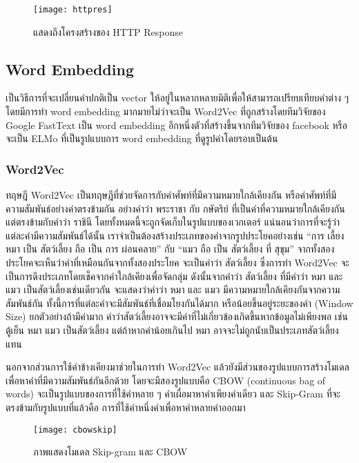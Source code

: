 \begin{figure}[H]
    \centering
    \texttt{[image: httpres]}
    \caption{แสดงถึงโครงสร้างของ HTTP Response \cite{Saixiii}}\label{fig:httpres}
\end{figure}

\subsection{Word Embedding}

เป็นวิธีการที่จะเปลี่ยนคำปกติเป็น vector ให้อยู่ในหลากหลายมิติเพื่อให้สามารถเปรียบเทียบคำต่าง ๆ 
 โดยมีการทำ word embedding มากมายไม่ว่าจะเป็น Word2Vec \cite{xin} \cite{Goldberg} ที่ถูกสร้างโดยทีมวิจัยของ 
Google FastText \cite{fasttext} เป็น word embedding อีกหนึ่งตัวที่สร้างขึ้นจากทีมวิจัยของ facebook หรือจะเป็น ELMo \cite{matthew} 
ที่เป็นรูปแบบการ word embedding ที่ดูรูปคำโดยรอบเป็นต้น 



\subsubsection{Word2Vec}
ทฤษฎี Word2Vec\cite{shortStoryForWord2Vec} เป็นทฤษฎีที่ช่วยจัดการกับคำศัพท์ที่มีความหมายใกล้เคียงกัน หรือคำศัพท์ที่มีความสัมพันธ์อย่างคำตรงข้ามกัน 
อย่างคำว่า พระราชา กับ กษัตริย์ ที่เป็นคำที่ความหมายใกล้เคียงกัน แต่ตรงข้ามกับคำว่า ราชินี โดยทั้งหมดนี้จะถูกจัดเก็บในรูปแบบของเวกเตอร์
แน่นอนว่าการที่จะรู้ว่าแต่ละคำมีความสัมพันธ์ได้นั้น เราจำเป็นต้องสร้างประเภทของคำจากรูปประโยคอย่างเช่น “การ เลี้ยง หมา เป็น สัตว์เลี้ยง ถือ เป็น การ ผ่อนคลาย” 
กับ “แมว ถือ เป็น สัตว์เลี้ยง ที่ สุขุม” จากทั้งสองประโยคจะเห็นว่าคำที่เหมือนกันจากทั้งสองประโยค จะเป็นคำว่า สัตว์เลี้ยง ซึ่งการทำ Word2Vec 
จะเป็นการดึงประเภทโดยเช็คจากคำใกล้เคียงเพื่อจัดกลุ่ม ดังนั้นจากคำว่า สัตว์เลี้ยง ที่มีคำว่า หมา และ แมว เป็นสัตว์เลี้ยงเช่นเดียวกัน จะแสดงว่าคำว่า 
หมา และ แมว มีความหมายใกล้เคียงกันจากความสัมพันธ์กัน ทั้งนี้การที่แต่ละคำจะมีสัมพันธ์ที่เชื่อมโยงกันได้มาก หรือน้อยขึ้นอยู่ระยะของคำ (Window Size) 
ยกตัวอย่างถ้ามีค่ามาก คำว่าสัตว์เลี้ยงอาจจะมีคำที่ไม่เกี่ยวข้องเกิดขึ้นหากข้อมูลไม่เพียงพอ เช่น ตู้เย็น หมา แมว เป็นสัตว์เลี้ยง แต่ถ้าหากค่าน้อยเกินไป หมา 
อาจจะไม่ถูกนับเป็นประเภทสัตว์เลี้ยงแทน

นอกจากส่วนการใช้คำข้างเคียงมาช่วยในการทำ Word2Vec แล้วยังมีส่วนของรูปแบบการสร้างโมเดลเพื่อหาคำที่มีความสัมพันธ์กันอีกด้วย 
โดยจะมีสองรูปแบบคือ CBOW (continuous bag of words) จะเป็นรูปแบบของการที่ใช้คำหลาย ๆ คำเผื่อมาหาคำเพียงคำเดียว 
และ Skip-Gram ที่จะตรงข้ามกับรูปแบบที่แล้วคือ การที่ใช้คำหนึ่งคำเพื่อหาคำหลายคำออกมา
\begin{figure}[H]
    \centering
    \texttt{[image: cbowskip]}
    \caption{ภาพแสดงโมเดล Skip-gram และ CBOW \cite{ichi}}\label{fig:cbowskip}
\end{figure}

